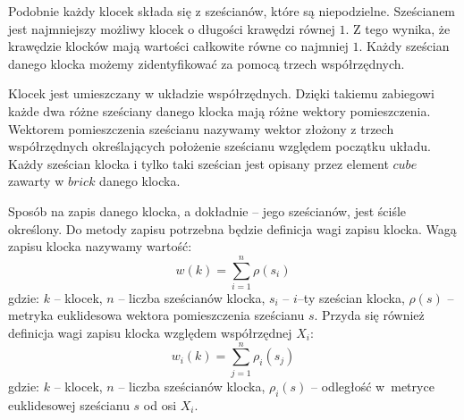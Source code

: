 \documentclass[12pt]{article}
\begin{document}
Podobnie każdy klocek składa się
z sześcianów, które są niepodzielne. Sześcianem jest najmniejszy możliwy
klocek o długości krawędzi równej $1$. Z tego wynika, że krawędzie klocków
mają wartości całkowite równe co najmniej $1$. Każdy sześcian danego
klocka możemy zidentyfikować za pomocą trzech współrzędnych.

Klocek jest
umieszczany w układzie współrzędnych. Dzięki takiemu zabiegowi każde dwa
różne sześciany danego klocka mają różne wektory pomieszczenia. Wektorem
pomieszczenia sześcianu nazywamy wektor złożony z trzech współrzędnych
określających położenie sześcianu względem początku układu. Każdy
sześcian klocka i tylko taki sześcian jest opisany przez element $cube$
zawarty w $brick$ danego klocka.

Sposób na zapis danego klocka, a dokładnie -- jego sześcianów, jest ściśle
określony. Do metody zapisu potrzebna będzie definicja wagi zapisu klocka.
Wagą zapisu klocka nazywamy wartość:
\begin{equation}
	w(k) = \sum_{i=1}^n \rho (s_i)
\end{equation}
gdzie:
$k$ -- klocek,
$n$ -- liczba sześcianów klocka,
$s_i$ -- $i$--ty sześcian klocka,
$\rho (s)$ -- metryka euklidesowa wektora pomieszczenia sześcianu $s$.
Przyda się również definicja wagi zapisu klocka względem współrzędnej
$X_i$:
\begin{equation}
	w_i(k) = \sum_{j=1}^n \rho_i(s_j)
\end{equation}
gdzie:
$k$ -- klocek,
$n$ -- liczba sześcianów klocka,
$\rho_i (s)$ -- odległość w~metryce euklidesowej sześcianu $s$ od osi $X_i$.
\end{document}
